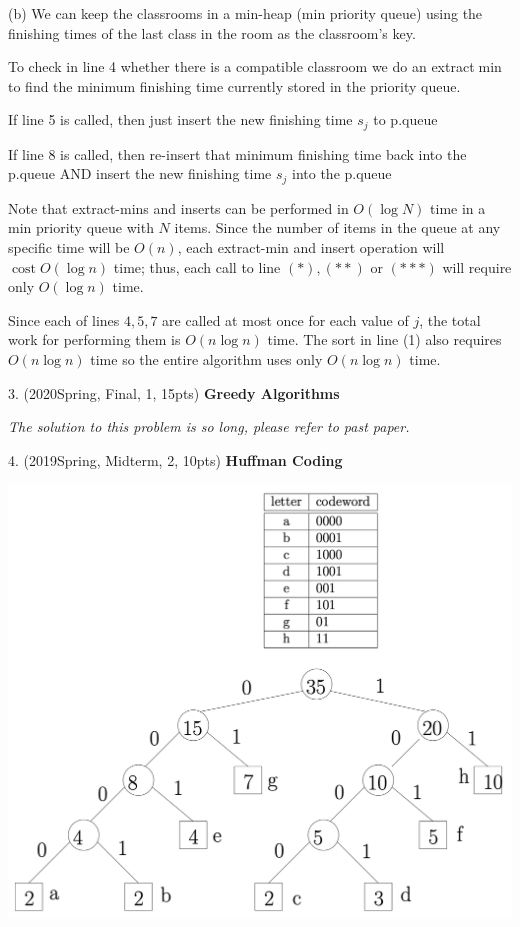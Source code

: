 \begin{spacing}{1.3}
    (b) We can keep the classrooms in a min-heap (min priority queue) using the finishing times of the last class in the room as the classroom's key.
    
    To check in line 4 whether there is a compatible classroom we do an extract$\min$ to find the minimum finishing time currently stored in the priority queue.
    
    If line 5 is called, then just insert the new finishing time $s_{j}$ to p.queue
    
    If line 8 is called, then re-insert that minimum finishing time back into the p.queue AND insert the new finishing time $s_{j}$ into the p.queue
    
    Note that extract-mins and inserts can be performed in $O(\log N)$ time in a min priority queue with $N$ items. Since the number of items in the queue at any specific time will be $O(n)$, each extract-min and insert operation will $\operatorname{cost} O(\log n)$ time; thus, each call to line $(*),(* *)$ or $(* * *)$ will require only $O(\log n)$ time.
    
    Since each of lines $4,5,7$ are called at most once for each value of $j$, the total work for performing them is $O(n \log n)$ time. The sort in line (1) also requires $O(n \log n)$ time so the entire algorithm uses only $O(n \log n)$ time.


    \vspace{0.5in}
    3. (2020Spring, Final, 1, 15pts) {\bf Greedy Algorithms} 

    {\it The solution to this problem is so long, please refer to past paper.}

    \vspace{0.5in}
    4. (2019Spring, Midterm, 2, 10pts) {\bf Huffman Coding}

    \includegraphics[scale=0.55]{images/07-exercise-2019s-huffman-sol.png}


\end{spacing}
